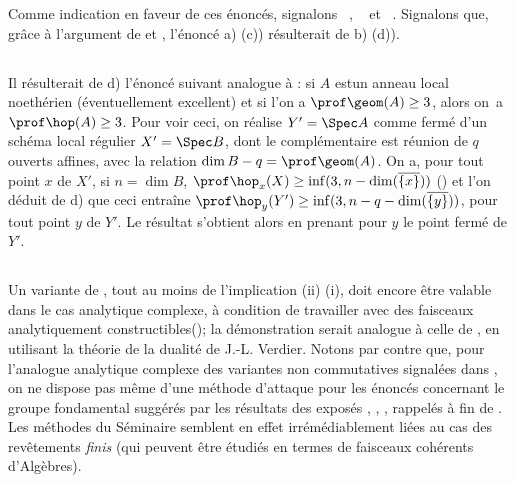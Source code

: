 Comme indication en faveur de ces \'enonc\'es, signalons ~, ~ et ~. Signalons que, gr\^ace \`a l'argument de  et , l'\'enonc\'e a) (\resp c)) r\'esulterait de b) (\resp d)).

\subsection{} \label{XIV.6.3}
Il r\'esulterait de d) l'\'enonc\'e suivant analogue \`a : si $A$ est\pageoriginale un anneau local noeth\'erien (\'eventuellement excellent) et si l'on a $\prof \geom (A) \geq 3$, alors on~a $\prof \hop (A) \geq 3$. Pour voir ceci, on r\'ealise $Y'=\Spec A$ comme ferm\'e d'un sch\'ema local r\'egulier $X'=\Spec B$, dont le compl\'ementaire est r\'eunion de $q$ ouverts affines, avec la relation $\dim B -q=\prof \geom(A)$. On a, pour tout point $x$ de $X'$, si $n=\dim B$, $\prof \hop_x(X) \geq \inf(3, n-\dim(\overline{\{x\}}))$ (\cf {}) et l'on d\'eduit de d) que ceci entra\^ine $\prof \hop_y(Y') \geq \inf(3, n-q-\dim(\overline{\{y\}}))$, pour tout point $y$ de $Y'$. Le r\'esultat s'obtient alors en prenant pour $y$ le point ferm\'e de $Y'$.

\subsection{} \label{XIV.6.4}
Un variante de , tout au moins de l'implication \textup{(ii)} \ALORS \textup{(i)}, doit encore \^etre valable dans le cas analytique complexe, \`a condition de travailler avec des faisceaux \og analytiquement constructibles\fg (\cf {}); la d\'emonstration serait analogue \`a celle de , en utilisant la th\'eorie de la dualit\'e de J.-L. Verdier. Notons par contre que, pour l'analogue analytique complexe des variantes non commutatives signal\'ees dans , on ne dispose pas m\^eme d'une m\'ethode d'attaque pour les \'enonc\'es concernant le groupe fondamental sugg\'er\'es par les r\'esultats des expos\'es , , , rappel\'es \`a fin de . Les m\'ethodes du S\'eminaire semblent en effet irr\'em\'ediablement li\'ees au cas des rev\^etements \emph{finis} (qui peuvent \^etre \'etudi\'es en termes de faisceaux coh\'erents d'Alg\`ebres).

